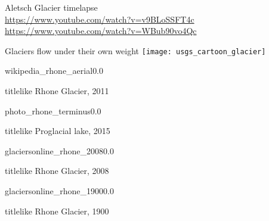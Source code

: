     \begin{frame}{}
      \centering
      Aletsch Glacier timelapse\\
      \bigskip
      \url{https://www.youtube.com/watch?v=v9BLoSSFT4c}\\
      \url{https://www.youtube.com/watch?v=WBub90vo4Qc}
    \end{frame}

    \begin{frame}{Glaciers flow under their own weight}
      \centering
      \texttt{[image: usgs\_cartoon\_glacier]}
    \end{frame}


    \begin{backgroundframe}{wikipedia_rhone_aerial}{0.0}{}
      \vspace{6cm}\hfill
      \begin{beamercolorbox}[sep=1em,wd=45mm]{titlelike}
        Rhone Glacier, 2011
      \end{beamercolorbox}
    \end{backgroundframe}

    \begin{backgroundframe}{photo_rhone_terminus}{0.0}{}
      \vspace{6cm}\hfill
      \begin{beamercolorbox}[sep=1em,wd=45mm]{titlelike}
        Proglacial lake, 2015
      \end{beamercolorbox}
    \end{backgroundframe}

    \begin{backgroundframe}{glaciersonline_rhone_2008}{0.0}{}
      \vspace{6cm}\hfill
      \begin{beamercolorbox}[sep=1em,wd=45mm]{titlelike}
        Rhone Glacier, 2008
      \end{beamercolorbox}
    \end{backgroundframe}

    \begin{backgroundframe}{glaciersonline_rhone_1900}{0.0}{}
      \vspace{6cm}\hfill
      \begin{beamercolorbox}[sep=1em,wd=45mm]{titlelike}
        Rhone Glacier, 1900
      \end{beamercolorbox}
    \end{backgroundframe}

